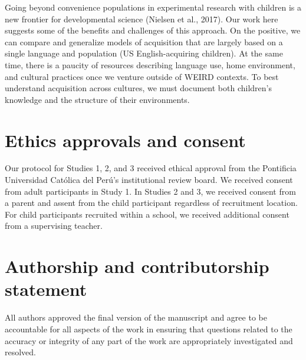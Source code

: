 \documentclass[
  english,
  ,apa7,floatsintext]{apa6}
\begin{document}
Going beyond convenience populations in experimental research with children is a new frontier for developmental science (Nielsen et al., 2017). Our work here suggests some of the benefits and challenges of this approach. On the positive, we can compare and generalize models of acquisition that are largely based on a single language and population (US English-acquiring children). At the same time, there is a paucity of resources describing language use, home environment, and cultural practices once we venture outside of WEIRD contexts. To best understand acquisition across cultures, we must document both children's knowledge and the structure of their environments.

\hypertarget{ethics-approvals-and-consent}{%
\section{Ethics approvals and consent}\label{ethics-approvals-and-consent}}

Our protocol for Studies 1, 2, and 3 received ethical approval from the Pontificia Universidad Católica del Perú's institutional review board. We received consent from adult participants in Study 1. In Studies 2 and 3, we received consent from a parent and assent from the child participant regardless of recruitment location. For child participants recruited within a school, we received additional consent from a supervising teacher.

\hypertarget{authorship-and-contributorship-statement}{%
\section{Authorship and contributorship statement}\label{authorship-and-contributorship-statement}}

All authors approved the final version of the manuscript and agree to be accountable
for all aspects of the work in ensuring that questions related to the accuracy or integrity of any part of the work are appropriately investigated and resolved.
\end{document}
